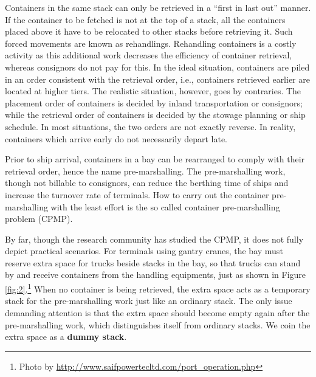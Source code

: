 \documentclass[review,3p,times,authoryear,12pt]{elsarticle}
\begin{document}
Containers in the same stack can only be retrieved in a ``first in last out'' manner. If the container to be fetched is not at the top of a stack, all the containers placed above it have to be relocated to other stacks before retrieving it. Such forced movements are known as rehandlings. Rehandling containers is a costly activity as this additional work decreases the efficiency of container retrieval, whereas consignors do not pay for this. In the ideal situation, containers are piled in an order consistent with the retrieval order, i.e., containers retrieved earlier are located at higher tiers. The realistic situation, however, goes by contraries. The placement order of containers is decided by inland transportation or consignors; while the retrieval order of containers is decided by the stowage planning or ship schedule. In most situations, the two orders are not exactly reverse. In reality, containers which arrive early do not necessarily depart late.

Prior to ship arrival, containers in a bay can be rearranged to comply with their retrieval order, hence the name pre-marshalling. The pre-marshalling work, though not billable to consignors, can reduce the berthing time of ships and increase the turnover rate of terminals. How to carry out the container pre-marshalling with the least effort is the so called container pre-marshalling problem (CPMP).



By far, though the research community has studied the CPMP, it does not fully depict practical scenarios. For terminals using gantry cranes, the bay must reserve extra space for trucks beside stacks in the bay, so that trucks can stand by and receive containers from the handling equipments, just as shown in Figure \ref{fig:2}.\footnote{Photo by \url{http://www.saifpowertecltd.com/port_operation.php}} When no container is being retrieved, the extra space acts as a temporary stack for the pre-marshalling work just like an ordinary stack. The only issue demanding attention is that the extra space should become empty again after the pre-marshalling work, which distinguishes itself from ordinary stacks. We coin the extra space as a \textbf{dummy stack}.
\end{document}

